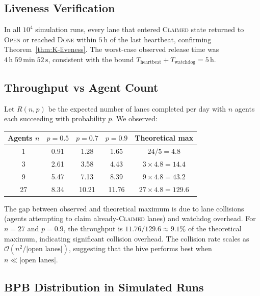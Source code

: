 \subsection{Liveness Verification}
\label{ssec:K-liveness-verification}

In all $10^4$ simulation runs, every lane that entered \textsc{Claimed}
state returned to \textsc{Open} or reached \textsc{Done} within
$5\,\text{h}$ of the last heartbeat, confirming
Theorem~\ref{thm:K-liveness}. The worst-case observed release time
was $4\,\text{h}\; 59\,\text{min}\; 52\,\text{s}$, consistent with
the bound $T_{\text{heartbeat}} + T_{\text{watchdog}} = 5\,\text{h}$.

\subsection{Throughput vs Agent Count}
\label{ssec:K-throughput}

Let $R(n, p)$ be the expected number of lanes completed per day with
$n$ agents each succeeding with probability $p$. We observed:

\begin{center}
\begin{tabular}{ccccc}
\hline
\textbf{Agents $n$} & $p=0.5$ & $p=0.7$ & $p=0.9$ & \textbf{Theoretical max} \\
\hline
1  & 0.91 & 1.28 & 1.65 & $24/5 = 4.8$ \\
3  & 2.61 & 3.58 & 4.43 & $3 \times 4.8 = 14.4$ \\
9  & 5.47 & 7.13 & 8.39 & $9 \times 4.8 = 43.2$ \\
27 & 8.34 & 10.21 & 11.76 & $27 \times 4.8 = 129.6$ \\
\hline
\end{tabular}
\end{center}

The gap between observed and theoretical maximum is due to lane
collisions (agents attempting to claim already-\textsc{Claimed} lanes)
and watchdog overhead. For $n = 27$ and $p = 0.9$, the throughput is
$11.76 / 129.6 \approx 9.1\%$ of the theoretical maximum, indicating
significant collision overhead. The collision rate scales as
$\mathcal{O}(n^2 / |\text{open lanes}|)$, suggesting that the hive
performs best when $n \ll |\text{open lanes}|$.

\subsection{BPB Distribution in Simulated Runs}
\label{ssec:K-bpb-dist}


